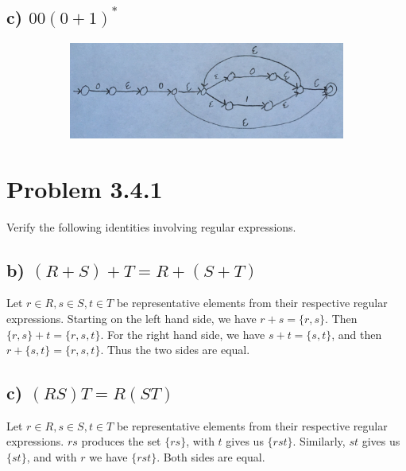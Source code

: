 \documentclass[20pt]{article} %
\begin{document}
\subsection{c) $00(0+1)^{*}$}
\begin{figure}[!htbp]
  	\centering
   	\begin{subfigure}[p]{0.8\linewidth}
    	\includegraphics[width=\linewidth]{./figures/h4-3.jpg}
   	\end{subfigure}
\end{figure}

\newpage
\section{Problem 3.4.1}
Verify the following identities involving regular expressions.
\subsection{b) $(R+S)+T=R+(S+T)$}

Let $r \in R, s \in S, t \in T$ be representative elements from their respective regular expressions. Starting on the left hand side, we have $r+s = \{r,s\}$. Then $\{r,s\}+t = \{r,s,t\}$. For the right hand side, we have $s+t = \{s,t\}$, and then $r+\{s,t\}=\{r,s,t\}$. Thus the two sides are equal.

\subsection{c) $(RS)T=R(ST)$}
Let $r \in R, s \in S, t \in T$ be representative elements from their respective regular expressions. $rs$ produces the set $\{rs\}$, with $t$ gives us $\{rst\}$.  Similarly, $st$ gives us $\{st\}$, and with $r$ we have $\{rst\}$.  Both sides are equal.
\end{document}
